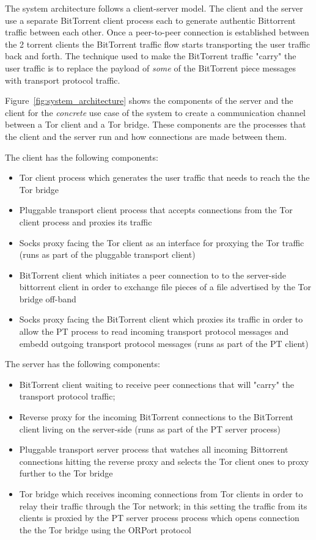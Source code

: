 \documentclass[11pt]{book} %
\begin{document}
The system architecture follows a client-server model. The client and the server use a separate BitTorrent client process each to generate authentic Bittorrent traffic between each other. Once a peer-to-peer connection is established between the 2 torrent clients the BitTorrent traffic flow starts transporting the user traffic back and forth. The technique used to make the BitTorrent traffic "carry" the user traffic is to replace the payload of \textit{some} of the BitTorrent piece messages with transport protocol traffic. 


Figure~\ref{fig:system_architecture} shows the components of the server and the client for the \textit{concrete} use case of the system to create a communication channel between a Tor client and a Tor bridge. These components are the processes that the client and the server run and how connections are made between them.

The client has the following components:

\begin{itemize}
\item Tor client process which generates the user traffic that needs to reach the the Tor bridge
\item Pluggable transport client process that accepts connections from the Tor client process and proxies its traffic
\item Socks proxy facing the Tor client as an interface for proxying the Tor traffic (runs as part of the pluggable transport client) 
\item BitTorrent client which initiates a peer connection to to the server-side bittorrent client in order to exchange file pieces of a file advertised by the Tor bridge off-band
\item Socks proxy facing the BitTorrent client which proxies its traffic in order to allow the PT process to read   incoming transport protocol messages and embedd outgoing transport protocol messages (runs as part of the PT client) 
\end{itemize}

The server has the following components:

\begin{itemize}

\item BitTorrent client waiting to receive peer connections that will "carry" the transport protocol traffic; 
\item Reverse proxy for the incoming BitTorrent connections to the BitTorrent client living on the server-side (runs as part of the PT server process)
\item Pluggable transport server process that watches all incoming Bittorrent connections hitting the reverse proxy and selects the Tor client ones to proxy further to the Tor bridge
\item Tor bridge which receives incoming connections from Tor clients in order to relay their traffic through the Tor network; in this setting the traffic from its clients is proxied by the PT server process process which opens connection the the Tor bridge using the ORPort protocol

\end{itemize}
\end{document}
